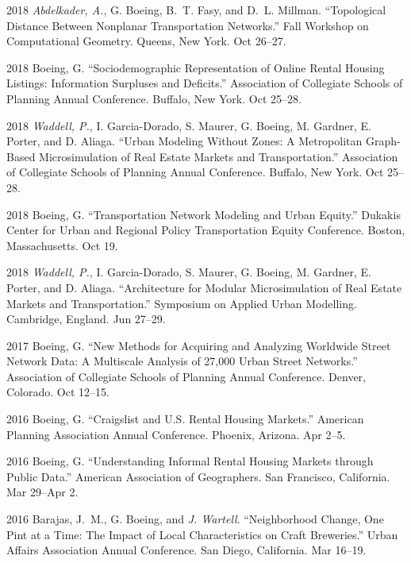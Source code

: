 \documentclass[12pt,letterpaper]{report}
\begin{document}
\begin{tablist}
        \item[2018] \tab \textit{Abdelkader, A.}, G. Boeing, B.~T. Fasy, and D.~L. Millman. \enquote{Topological Distance Between Nonplanar Transportation Networks.} Fall Workshop on Computational Geometry. Queens, New York. Oct 26--27.

        \item[2018] \tab Boeing, G. \enquote{Sociodemographic Representation of Online Rental Housing Listings: Information Surpluses and Deficits.} Association of Collegiate Schools of Planning Annual Conference. Buffalo, New York. Oct 25--28.

        \item[2018] \tab \textit{Waddell, P.}, I. Garcia-Dorado, S. Maurer, G. Boeing, M. Gardner, E. Porter, and D. Aliaga. \enquote{Urban Modeling Without Zones: A Metropolitan Graph-Based Microsimulation of Real Estate Markets and Transportation.} Association of Collegiate Schools of Planning Annual Conference. Buffalo, New York. Oct 25--28.

        \item[2018] \tab Boeing, G. \enquote{Transportation Network Modeling and Urban Equity.} Dukakis Center for Urban and Regional Policy Transportation Equity Conference. Boston, Massachusetts. Oct 19.

        \item[2018] \tab \textit{Waddell, P.}, I. Garcia-Dorado, S. Maurer, G. Boeing, M. Gardner, E. Porter, and D. Aliaga. \enquote{Architecture for Modular Microsimulation of Real Estate Markets and Transportation.} Symposium on Applied Urban Modelling. Cambridge, England. Jun 27--29.

        \item[2017] \tab Boeing, G. \enquote{New Methods for Acquiring and Analyzing Worldwide Street Network Data: A Multiscale Analysis of 27,000 Urban Street Networks.} Association of Collegiate Schools of Planning Annual Conference. Denver, Colorado. Oct 12--15.

        \item[2016] \tab Boeing, G. \enquote{Craigslist and U.S. Rental Housing Markets.} American Planning Association Annual Conference. Phoenix, Arizona. Apr 2--5.

        \item[2016] \tab Boeing, G. \enquote{Understanding Informal Rental Housing Markets through Public Data.} American Association of Geographers. San Francisco, California. Mar 29--Apr 2.

        \item[2016] \tab Barajas, J.~M., G. Boeing, and \textit{J. Wartell}. \enquote{Neighborhood Change, One Pint at a Time: The Impact of Local Characteristics on Craft Breweries.} Urban Affairs Association Annual Conference. San Diego, California. Mar 16--19.


\end{tablist}
\end{document}

